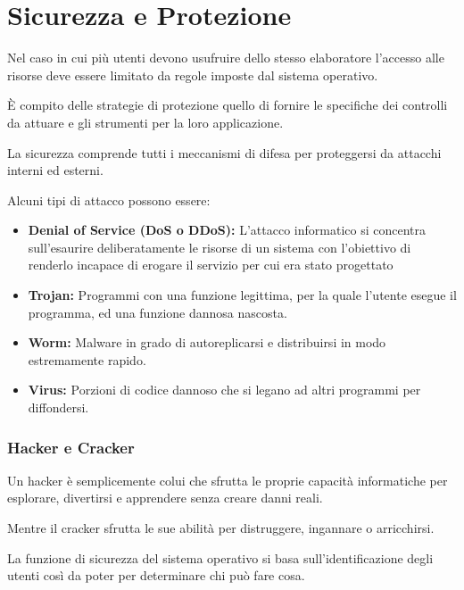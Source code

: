 \section{Sicurezza e Protezione}
Nel caso in cui più utenti devono usufruire dello stesso elaboratore l'accesso alle risorse deve essere limitato da regole imposte dal sistema operativo.

È compito delle strategie di protezione quello di fornire le specifiche dei controlli da attuare e gli strumenti per la loro applicazione.

\spacer
La sicurezza comprende tutti i meccanismi di difesa per proteggersi da attacchi interni ed esterni.

Alcuni tipi di attacco possono essere:
\begin{itemize}
    \item \textbf{Denial of Service (DoS o DDoS):} L'attacco informatico si concentra sull'esaurire deliberatamente le risorse di un sistema con l'obiettivo di renderlo incapace di erogare il servizio per cui era stato progettato
    \item \textbf{Trojan:} Programmi con una funzione legittima, per la quale l'utente esegue il programma, ed una funzione dannosa nascosta.
    \item \textbf{Worm:} Malware in grado di autoreplicarsi e distribuirsi in modo estremamente rapido.
    \item \textbf{Virus:} Porzioni di codice dannoso che si legano ad altri programmi per diffondersi.
\end{itemize}

\begin{note}
    \subsubsection*{Hacker e Cracker}
    Un hacker è semplicemente colui che sfrutta le proprie capacità informatiche per esplorare, divertirsi e apprendere senza creare danni reali.

    Mentre il cracker sfrutta le sue abilità per distruggere, ingannare o arricchirsi.
\end{note}

La funzione di sicurezza del sistema operativo si basa sull'identificazione degli utenti così da poter per determinare chi può fare cosa.